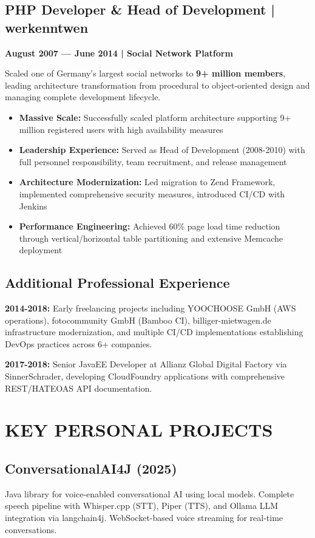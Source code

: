 \documentclass[11pt,a4paper]{article}
\begin{document}
\subsection{PHP Developer \& Head of Development | werkenntwen}
\textbf{August 2007 --- June 2014 | Social Network Platform}

Scaled one of Germany's largest social networks to \textbf{9+ million members}, leading architecture transformation from procedural to object-oriented design and managing complete development lifecycle.

\begin{itemize}
\item \textbf{Massive Scale:} Successfully scaled platform architecture supporting 9+ million registered users with high availability measures
\item \textbf{Leadership Experience:} Served as Head of Development (2008-2010) with full personnel responsibility, team recruitment, and release management
\item \textbf{Architecture Modernization:} Led migration to Zend Framework, implemented comprehensive security measures, introduced CI/CD with Jenkins
\item \textbf{Performance Engineering:} Achieved 60\% page load time reduction through vertical/horizontal table partitioning and extensive Memcache deployment
\end{itemize}

\subsection{Additional Professional Experience}
\textbf{2014-2018:} Early freelancing projects including YOOCHOOSE GmbH (AWS operations), fotocommunity GmbH (Bamboo CI), billiger-mietwagen.de infrastructure modernization, and multiple CI/CD implementations establishing DevOps practices across 6+ companies.

\textbf{2017-2018:} Senior JavaEE Developer at Allianz Global Digital Factory via SinnerSchrader, developing CloudFoundry applications with comprehensive REST/HATEOAS API documentation.

\section{KEY PERSONAL PROJECTS}

\subsection{ConversationalAI4J (2025)}
Java library for voice-enabled conversational AI using local models. Complete speech pipeline with Whisper.cpp (STT), Piper (TTS), and Ollama LLM integration via langchain4j. WebSocket-based voice streaming for real-time conversations.
\end{document}
